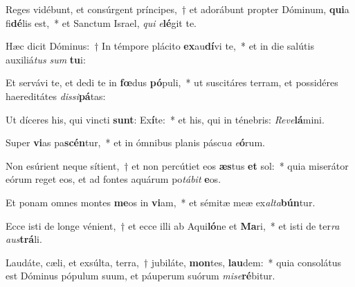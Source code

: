 \item Reges vidébunt, et consúrgent príncipes,~† et adorábunt propter Dóminum, \textbf{qui}a fi\textbf{dé}lis est,~* et Sanctum Israel, \textit{qui} \textit{e}\textbf{lé}git te.
\item Hæc dicit Dóminus:~† In témpore plácito \textbf{ex}au\textbf{dí}vi te,~* et in die salútis auxiliá\textit{tus} \textit{sum} \textbf{tu}i:
\item Et servávi te, et dedi te in \textbf{fœ}dus \textbf{pó}puli,~* ut suscitáres terram, et possidéres haereditátes \textit{dis}\textit{si}\textbf{pá}tas:
\item Ut díceres his, qui vincti \textbf{sunt}: Ex\textbf{í}te:~* et his, qui in ténebris: \textit{Re}\textit{ve}\textbf{lá}mini.
\item Super \textbf{vi}as pa\textbf{scén}tur,~* et in ómnibus planis páscu\textit{a} \textit{e}\textbf{ó}rum.
\item Non esúrient neque sítient,~† et non percútiet eos \textbf{æs}tus \textbf{et} sol:~* quia miserátor eórum reget eos, et ad fontes aquárum po\textit{tá}\textit{bit} \textbf{e}os.
\item Et ponam omnes montes \textbf{me}os in \textbf{vi}am,~* et sémitæ meæ ex\textit{al}\textit{ta}\textbf{bún}tur.
\item Ecce isti de longe vénient,~† et ecce illi ab Aqui\textbf{ló}ne et \textbf{Ma}ri,~* et isti de ter\textit{ra} \textit{aus}\textbf{trá}li.
\item Laudáte, cæli, et exsúlta, terra,~† jubiláte, \textbf{mon}tes, \textbf{lau}dem:~* quia consolátus est Dóminus pópulum suum, et páuperum suórum \textit{mi}\textit{se}\textbf{ré}bitur.
